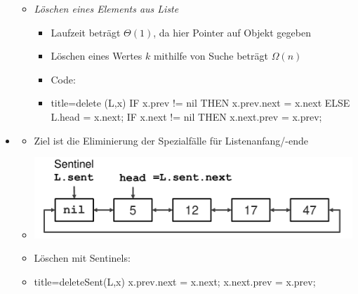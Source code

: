 \documentclass[
    12pt,
    a4paper,
    ngerman,
    color=3b,%
    marginpar=false,
    colorback=false,
    leqno,
]{tudaexercise}
\begin{document}
\begin{itemize}
\begin{itemize}
              \item \textit{Löschen eines Elements aus Liste}
                    \begin{itemize}
                        \item Laufzeit beträgt $\Theta(1)$, da hier Pointer auf Objekt gegeben
                        \item[] Löschen eines Wertes $k$ mithilfe von Suche beträgt $\Omega(n)$
                        \item Code:
                        \item[]
                              \begin{ccode}[autogobble]{title={delete (L,x)}}
                                  IF x.prev != nil THEN
                                    x.prev.next = x.next
                                  ELSE
                                    L.head = x.next;
                                  IF x.next != nil THEN
                                    x.next.prev = x.prev;
                              \end{ccode}
                    \end{itemize}
          \end{itemize}

    \item {}
          \begin{itemize}
              \item Ziel ist die Eliminierung der Spezialfälle für Listenanfang/-ende
              \item[] \includegraphics[width=12cm]{pictures/linkedListSentinel.pdf}
              \item Löschen mit Sentinels:
              \item[]
                    \begin{ccode}[autogobble]{title={deleteSent(L,x)}}
                        x.prev.next = x.next;
                        x.next.prev = x.prev;
                    \end{ccode}
          \end{itemize}
\end{itemize}
\clearpage
\end{document}
